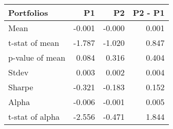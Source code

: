\begin{tabular}{lrrr}
\toprule
Portfolios & P1 & P2 & P2 - P1 \\
\midrule
Mean & -0.001 & -0.000 & 0.001 \\
t-stat of mean & -1.787 & -1.020 & 0.847 \\
p-value of mean & 0.084 & 0.316 & 0.404 \\
Stdev & 0.003 & 0.002 & 0.004 \\
Sharpe & -0.321 & -0.183 & 0.152 \\
Alpha & -0.006 & -0.001 & 0.005 \\
t-stat of alpha & -2.556 & -0.471 & 1.844 \\
\bottomrule
\end{tabular}
